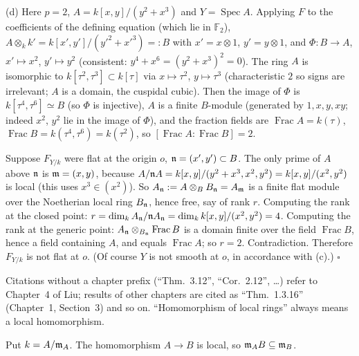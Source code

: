 \documentclass[11pt]{article}
\begin{document}
(d) Here $p=2$, $A=k[x,y]/(y^2+x^3)$ and $Y=\operatorname{Spec}A$. Applying $F$ to the coefficients of the defining equation (which lie in $\mathbb F_2$), $A\otimes_kk'=k[x',y']/(y'^2+x'^3)=:B$ with $x'=x\otimes1$, $y'=y\otimes1$, and $\Phi:B\to A$, $x'\mapsto x^2$, $y'\mapsto y^2$ (consistent: $y^4+x^6=(y^2+x^3)^2=0$). The ring $A$ is isomorphic to $k[\tau^2,\tau^3]\subset k[\tau]$ via $x\mapsto\tau^2$, $y\mapsto\tau^3$ (characteristic $2$ so signs are irrelevant; $A$ is a domain, the cuspidal cubic). Then the image of $\Phi$ is $k[\tau^4,\tau^6]\simeq B$ (so $\Phi$ is injective), $A$ is a finite $B$-module (generated by $1,x,y,xy$; indeed $x^2$, $y^2$ lie in the image of $\Phi$), and the fraction fields are $\operatorname{Frac}A=k(\tau)$, $\operatorname{Frac}B=k(\tau^4,\tau^6)=k(\tau^2)$, so $[\operatorname{Frac}A:\operatorname{Frac}B]=2$.

Suppose $F_{Y/k}$ were flat at the origin $o$, $\mathfrak n=(x',y')\subset B$. The only prime of $A$ above $\mathfrak n$ is $\mathfrak m=(x,y)$, because $A/\mathfrak n A=k[x,y]/(y^2+x^3,x^2,y^2)=k[x,y]/(x^2,y^2)$ is local (this uses $x^3\in(x^2)$). So $A_{\mathfrak n}:=A\otimes_BB_{\mathfrak n}=A_{\mathfrak m}$ is a finite flat module over the Noetherian local ring $B_{\mathfrak n}$, hence free, say of rank $r$. Computing the rank at the closed point: $r=\dim_kA_{\mathfrak n}/\mathfrak n A_{\mathfrak n}=\dim_kk[x,y]/(x^2,y^2)=4$. Computing the rank at the generic point: $A_{\mathfrak n}\otimes_{B_{\mathfrak n}}\operatorname{Frac}B$ is a domain finite over the field $\operatorname{Frac}B$, hence a field containing $A$, and equals $\operatorname{Frac}A$; so $r=2$. Contradiction. Therefore $F_{Y/k}$ is not flat at $o$. (Of course $Y$ is not smooth at $o$, in accordance with (c).) \hfill$\square$

Citations without a chapter prefix (``Thm.~3.12'', ``Cor.~2.12'', \dots) refer to Chapter~4 of Liu; results of other chapters are cited as ``Thm.~1.3.16'' (Chapter~1, Section~3) and so on. ``Homomorphism of local rings'' always means a local homomorphism.

\pf
Put $k=A/\mathfrak m_A$. The homomorphism $A\to B$ is local, so $\mathfrak m_AB\subseteq\mathfrak m_B$.
\end{document}
